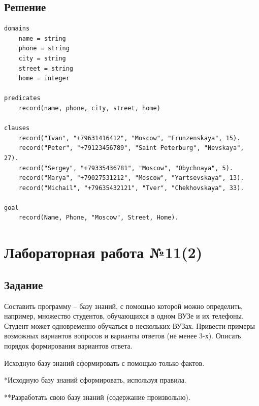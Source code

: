 \documentclass[12pt]{report}
\begin{document}
\section*{Решение}
\begin{lstlisting}
domains
	name = string
	phone = string
	city = string
	street = string
	home = integer
	
predicates
	record(name, phone, city, street, home)
	
clauses
	record("Ivan", "+79631416412", "Moscow", "Frunzenskaya", 15).
	record("Peter", "+79123456789", "Saint Peterburg", "Nevskaya", 27).
	record("Sergey", "+79335436781", "Moscow", "Obychnaya", 5).
	record("Marya", "+79027531212", "Moscow", "Yartsevskaya", 13).
	record("Michail", "+79635432121", "Tver", "Chekhovskaya", 33).
	
goal
	record(Name, Phone, "Moscow", Street, Home).
\end{lstlisting}


\chapter*{Лабораторная работа №11(2)}
\section*{Задание}

Составить программу -- базу знаний, с помощью которой можно определить, например, множество студентов, обучающихся в одном ВУЗе и их телефоны. Студент может одновременно обучаться в нескольких ВУЗах. Привести примеры возможных вариантов вопросов и варианты ответов (не менее 3-х). Описать порядок формирования вариантов ответа.

Исходную базу знаний сформировать с помощью только фактов.

*Исходную базу знаний сформировать, используя правила.

**Разработать свою базу знаний (содержание произвольно).
\end{document}
